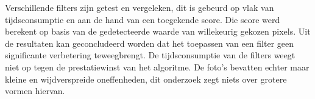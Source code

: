 Verschillende filters zijn getest en vergeleken, dit is gebeurd op vlak van tijdsconsumptie en aan de hand van een toegekende score. Die score werd berekent op basis van de gedetecteerde waarde van willekeurig gekozen pixels. Uit de resultaten kan geconcludeerd worden dat het toepassen van een filter geen significante verbetering teweegbrengt. De tijdsconsumptie van de filters weegt niet op tegen de prestatiewinst van het algoritme. De foto's bevatten echter maar kleine en wijdverspreide oneffenheden, dit onderzoek zegt niets over grotere vormen hiervan.
